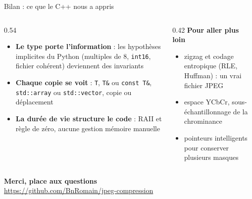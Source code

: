 \documentclass[aspectratio=169,10pt]{beamer}
\newcommand{\speaker}{}
\newcommand{\code}[1]{\texttt{#1}}
\begin{document}
\begin{frame}{Bilan : ce que le C++ nous a appris}
  \begin{columns}[T]
    \begin{column}{0.54\textwidth}
      \begin{itemize}
        \item \textbf{Le type porte l'information} : les hypothèses implicites du Python
          (multiples de 8, \code{int16}, fichier cohérent) deviennent des invariants
        \item \textbf{Chaque copie se voit} : \code{T}, \code{T\&} ou \code{const T\&},
          \code{std::array} ou \code{std::vector}, copie ou déplacement
        \item \textbf{La durée de vie structure le code} : RAII et règle de zéro, aucune
          gestion mémoire manuelle
      \end{itemize}
    \end{column}
    \begin{column}{0.42\textwidth}
      \textbf{Pour aller plus loin}
      \begin{itemize}
        \item zigzag et codage entropique (RLE, Huffman) : un vrai fichier JPEG
        \item espace YCbCr, sous-échantillonnage de la chrominance
        \item pointeurs intelligents pour conserver plusieurs masques
      \end{itemize}
    \end{column}
  \end{columns}
  \vspace{1.6em}
  \centering
  {\large\bfseries\color{accent} Merci, place aux questions}\\[0.4em]
  \small \url{https://github.com/BnRomain/jpeg-compression}
\end{frame}

\appendix
\renewcommand{\speaker}{Annexe}
\end{document}
